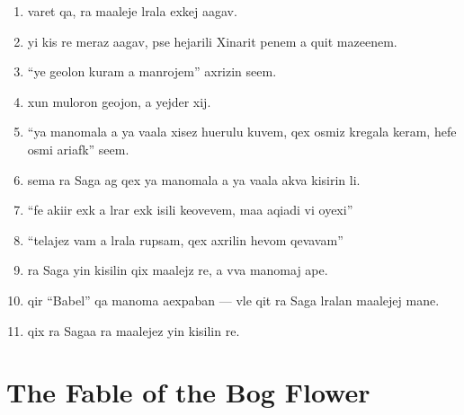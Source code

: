 \documentclass{article}
\begin{document}
\begin{multicols}{2}
\begin{enumerate}
\end{enumerate}


\newcolumn

\begin{enumerate}
\item varet qa, ra maaleje lrala exkej aagav.
\item yi kis re meraz aagav, pse hejarili Xinarit penem a quit mazeenem.
\item ``ye geolon kuram a manrojem'' axrizin seem.
\item xun muloron geojon, a yejder xij.
\item ``ya manomala a ya vaala xisez huerulu kuvem, qex osmiz kregala keram, hefe osmi ariafk'' seem.
\item sema ra Saga ag qex ya manomala a ya vaala akva kisirin li.
\item ``fe akiir exk a lrar exk isili keovevem, maa aqiadi vi oyexi''
\item ``telajez vam a lrala rupsam, qex axrilin hevom qevavam''
\item ra Saga yin kisilin qix maalejz re, a vva manomaj ape.
\item qir ``Babel'' qa manoma aexpaban --- vle qit ra Saga lralan maalejej mane.
\item qix ra Sagaa ra maalejez yin kisilin re. 

\end{enumerate}

\end{multicols}

\section{The Fable of the Bog Flower}

\end{document}
